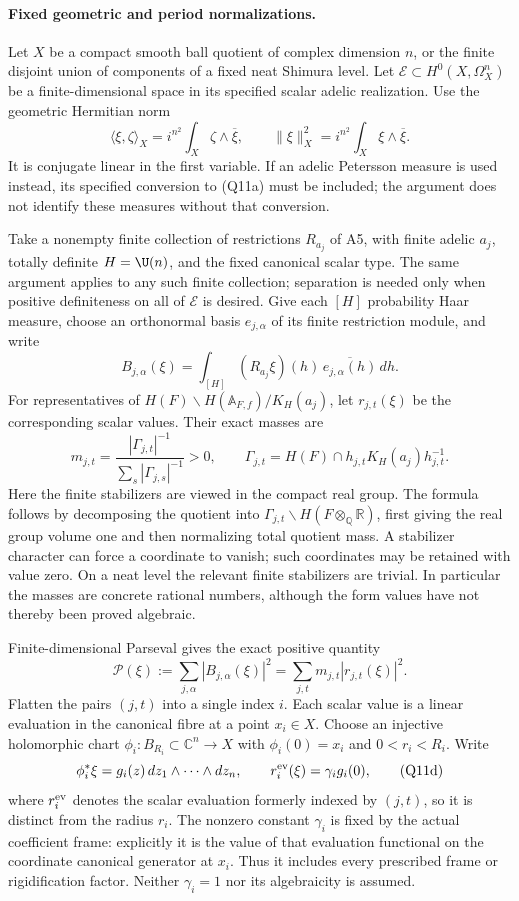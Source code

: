 \documentclass[11pt]{article}
\newcommand{\Q}{\mathbb Q}\newcommand{\C}{\mathbb C}\newcommand{\Z}{\mathbb Z}\newcommand{\R}{\mathbb R}\newcommand{\A}{\mathbb A}\newcommand{\OO}{\mathcal O}
\theoremstyle{definition}\newtheorem{definition}[theorem]{Definition}\newtheorem{remark}[theorem]{Remark}
\begin{document}
\paragraph{Fixed geometric and period normalizations.}
Let $X$ be a compact smooth ball quotient of complex dimension
$n$, or the finite disjoint union of components of a fixed neat
Shimura level.  Let $\mathcal E\subset H^0(X,\Omega_X^n)$ be a
finite-dimensional space in its specified scalar adelic
realization.  Use the geometric Hermitian norm
\[
 \langle\xi,\zeta\rangle_X
       =i^{n^2}\int_X\zeta\wedge\overline\xi,
 \qquad \|\xi\|_X^2=i^{n^2}\int_X\xi\wedge\overline\xi.
 \tag{Q11a}
\]
It is conjugate linear in the first variable.  If an adelic
Petersson measure is used instead, its specified conversion to
(Q11a) must be included; the argument does not identify these
measures without that conversion.

Take a nonempty finite collection of restrictions $R_{a_j}$ of A5, with finite adelic
$a_j$, totally definite $H=\U(n)$, and the fixed canonical
scalar type.  The same argument applies to any such finite
collection; separation is needed only when positive definiteness
on all of $\mathcal E$ is desired.  Give each $[H]$ probability
Haar measure, choose an orthonormal basis $e_{j,\alpha}$ of its
finite restriction module, and write
\[
 B_{j,\alpha}(\xi)
     =\int_{[H]}(R_{a_j}\xi)(h)\,
                              \overline{e_{j,\alpha}(h)}\,dh .
\]
For representatives of
$H(F)\backslash H(\A_{F,f})/K_H(a_j)$, let $r_{j,t}(\xi)$
be the corresponding scalar values.  Their exact masses are
\[
 m_{j,t}=
    \frac{|\Gamma_{j,t}|^{-1}}
         {\displaystyle\sum_s|\Gamma_{j,s}|^{-1}}>0,
 \qquad
 \Gamma_{j,t}=H(F)\cap h_{j,t}K_H(a_j)h_{j,t}^{-1}.
 \tag{Q11b}
\]
Here the finite stabilizers are viewed in the compact real
group.  The formula follows by decomposing the quotient into
$\Gamma_{j,t}\backslash H(F\otimes_\Q\R)$, first giving the
real group volume one and then normalizing total quotient mass.
A stabilizer character can force a coordinate to vanish; such
coordinates may be retained with value zero.  On a neat level
the relevant finite stabilizers are trivial.  In particular the
masses are concrete rational numbers, although the form values
have not thereby been proved algebraic.

Finite-dimensional Parseval gives the exact positive quantity
\[
 \mathcal P(\xi):=\sum_{j,\alpha}|B_{j,\alpha}(\xi)|^2
          =\sum_{j,t}m_{j,t}|r_{j,t}(\xi)|^2.
 \tag{Q11c}
\]
Flatten the pairs $(j,t)$ into a single index $i$.  Each scalar
value is a linear evaluation in the canonical fibre at a point
$x_i\in X$.  Choose an injective holomorphic chart
$\phi_i:B_{R_i}\subset\C^n\longrightarrow X$ with
$\phi_i(0)=x_i$ and $0<r_i<R_i$.  Write
\[
 \phi_i^*\xi=g_i(z)\,dz_1\wedge\cdots\wedge dz_n,
 \qquad r_i^{\rm ev}(\xi)=\gamma_i g_i(0),
 \tag{Q11d}
\]
where $r_i^{\rm ev}$ denotes the scalar evaluation formerly
indexed by $(j,t)$, so it is distinct from the radius $r_i$.
The nonzero constant $\gamma_i$ is fixed by the actual
coefficient frame: explicitly it is the value of that
evaluation functional on the coordinate canonical generator
at $x_i$.  Thus it includes every prescribed frame or
rigidification factor.  Neither $\gamma_i=1$ nor its
algebraicity is assumed.
\end{document}
